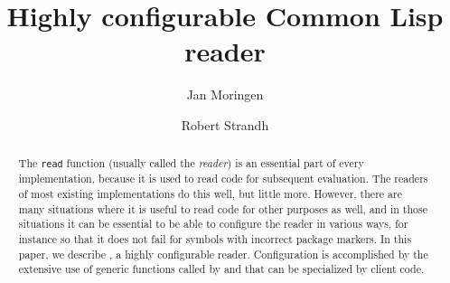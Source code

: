 \documentclass[format=sigconf]{acmart}
\def\inputtex#1{}
\begin{document}
\title{Highly configurable Common Lisp reader}

\author{Jan Moringen}

\author{Robert Strandh}

\begin{abstract}
The \cl{} \texttt{read} function (usually called the \cl{}
\emph{reader}) is an essential part of every \cl{} implementation,
because it is used to read \cl{} code for subsequent evaluation.  The
readers of most existing \cl{} implementations do this well, but
little more.  However, there are many situations where it is useful to
read \cl{} code for other purposes as well, and in those situations it
can be essential to be able to configure the reader in various ways,
for instance so that it does not fail for symbols with incorrect
package markers.  In this paper, we describe \eclector{}, a highly
configurable \cl{} reader.  Configuration is accomplished by the
extensive use of \cl{} generic functions called by \eclector{} and
that can be specialized by client code.
\end{abstract}

\maketitle


\inputtex{sec-introduction.tex}
\inputtex{sec-previous.tex}
\inputtex{sec-our-method.tex}
\inputtex{sec-applications.tex}
\inputtex{sec-performance.tex}
\inputtex{sec-conclusions.tex}




\end{document}
